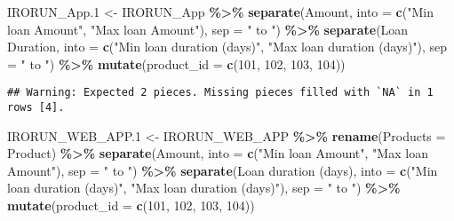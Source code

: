 \documentclass[
]{article}
\newenvironment{Shaded}{\begin{snugshade}}{\end{snugshade}}
\newcommand{\AttributeTok}[1]{\textcolor[rgb]{0.13,0.29,0.53}{#1}}
\newcommand{\DecValTok}[1]{\textcolor[rgb]{0.00,0.00,0.81}{#1}}
\newcommand{\FloatTok}[1]{\textcolor[rgb]{0.00,0.00,0.81}{#1}}
\newcommand{\FunctionTok}[1]{\textcolor[rgb]{0.13,0.29,0.53}{\textbf{#1}}}
\newcommand{\NormalTok}[1]{#1}
\newcommand{\OtherTok}[1]{\textcolor[rgb]{0.56,0.35,0.01}{#1}}
\newcommand{\SpecialCharTok}[1]{\textcolor[rgb]{0.81,0.36,0.00}{\textbf{#1}}}
\newcommand{\StringTok}[1]{\textcolor[rgb]{0.31,0.60,0.02}{#1}}
\begin{document}
\begin{Shaded}
\begin{Highlighting}[]
\NormalTok{IRORUN\_App}\FloatTok{.1} \OtherTok{\textless{}{-}}\NormalTok{ IRORUN\_App }\SpecialCharTok{\%\textgreater{}\%} 
  \FunctionTok{separate}\NormalTok{(Amount, }\AttributeTok{into =} \FunctionTok{c}\NormalTok{(}\StringTok{"Min loan Amount"}\NormalTok{, }\StringTok{"Max loan Amount"}\NormalTok{), }\AttributeTok{sep =} \StringTok{" to "}\NormalTok{) }\SpecialCharTok{\%\textgreater{}\%} 
  \FunctionTok{separate}\NormalTok{(}\StringTok{\textasciigrave{}}\AttributeTok{Loan Duration}\StringTok{\textasciigrave{}}\NormalTok{, }\AttributeTok{into =} \FunctionTok{c}\NormalTok{(}\StringTok{"Min loan duration (days)"}\NormalTok{, }\StringTok{"Max loan duration (days)"}\NormalTok{), }\AttributeTok{sep =} \StringTok{" to "}\NormalTok{) }\SpecialCharTok{\%\textgreater{}\%} 
  \FunctionTok{mutate}\NormalTok{(}\AttributeTok{product\_id =} \FunctionTok{c}\NormalTok{(}\DecValTok{101}\NormalTok{, }\DecValTok{102}\NormalTok{, }\DecValTok{103}\NormalTok{, }\DecValTok{104}\NormalTok{))}
\end{Highlighting}
\end{Shaded}

\begin{verbatim}
## Warning: Expected 2 pieces. Missing pieces filled with `NA` in 1 rows [4].
\end{verbatim}

\begin{Shaded}
\begin{Highlighting}[]
\NormalTok{IRORUN\_WEB\_APP}\FloatTok{.1} \OtherTok{\textless{}{-}}\NormalTok{ IRORUN\_WEB\_APP }\SpecialCharTok{\%\textgreater{}\%}
  \FunctionTok{rename}\NormalTok{(}\AttributeTok{Products =}\NormalTok{ Product) }\SpecialCharTok{\%\textgreater{}\%} 
  \FunctionTok{separate}\NormalTok{(Amount, }\AttributeTok{into =} \FunctionTok{c}\NormalTok{(}\StringTok{"Min loan Amount"}\NormalTok{, }\StringTok{"Max loan Amount"}\NormalTok{), }\AttributeTok{sep =} \StringTok{" to "}\NormalTok{) }\SpecialCharTok{\%\textgreater{}\%} 
  \FunctionTok{separate}\NormalTok{(}\StringTok{\textasciigrave{}}\AttributeTok{Loan  duration (days)}\StringTok{\textasciigrave{}}\NormalTok{, }\AttributeTok{into =} \FunctionTok{c}\NormalTok{(}\StringTok{"Min loan duration (days)"}\NormalTok{, }\StringTok{"Max loan duration (days)"}\NormalTok{), }\AttributeTok{sep =} \StringTok{" to "}\NormalTok{) }\SpecialCharTok{\%\textgreater{}\%} 
  \FunctionTok{mutate}\NormalTok{(}\AttributeTok{product\_id =} \FunctionTok{c}\NormalTok{(}\DecValTok{101}\NormalTok{, }\DecValTok{102}\NormalTok{, }\DecValTok{103}\NormalTok{, }\DecValTok{104}\NormalTok{))}
\end{Highlighting}
\end{Shaded}
\end{document}
